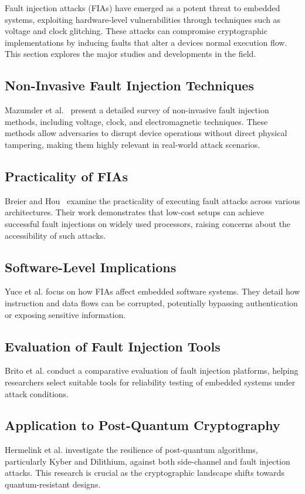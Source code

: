 Fault injection attacks (FIAs) have emerged as a potent threat to embedded systems, exploiting hardware-level vulnerabilities through techniques such as voltage and clock glitching. These attacks can compromise cryptographic implementations by inducing faults that alter a devices normal execution flow. This section explores the major studies and developments in the field.

\subsection{Non-Invasive Fault Injection Techniques}
Mazumder et al.~\cite{mazumder2023comprehensive} present a detailed survey of non-invasive fault injection methods, including voltage, clock, and electromagnetic techniques. These methods allow adversaries to disrupt device operations without direct physical tampering, making them highly relevant in real-world attack scenarios.

\subsection{Practicality of FIAs}
Breier and Hou~\cite{breier2022practical} examine the practicality of executing fault attacks across various architectures. Their work demonstrates that low-cost setups can achieve successful fault injections on widely used processors, raising concerns about the accessibility of such attacks.

\subsection{Software-Level Implications}
Yuce et al.\cite{yuce2020fault} focus on how FIAs affect embedded software systems. They detail how instruction and data flows can be corrupted, potentially bypassing authentication or exposing sensitive information.



\subsection{Evaluation of Fault Injection Tools}
Brito et al. \cite{brito2023evaluation} conduct a comparative evaluation of fault injection platforms, helping researchers select suitable tools for reliability testing of embedded systems under attack conditions.

\subsection{Application to Post-Quantum Cryptography}
Hermelink et al. \cite{hermelink2023side} investigate the resilience of post-quantum algorithms, particularly Kyber and Dilithium, against both side-channel and fault injection attacks. This research is crucial as the cryptographic landscape shifts towards quantum-resistant designs.
